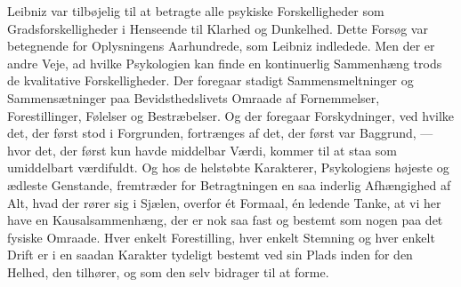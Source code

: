 \documentclass[12pt,a4paper]{book}
\newcommand{\opage}[1]{\marginnote{\footnotesize\textit{[#1]}}}
\begin{document}
Leibniz var tilbøjelig til at betragte alle psykiske Forskelligheder
som Gradsforskelligheder i Henseende til Klarhed og Dunkelhed. Dette
Forsøg var betegnende for Oplysningens Aarhundrede, som Leibniz
indledede. Men der er andre Veje, ad hvilke Psykologien kan finde en
kontinuerlig Sammenhæng trods de kvalitative Forskelligheder. Der
foregaar stadigt Sammensmeltninger og Sammensætninger paa
Bevidsthedslivets Omraade af Fornemmelser, Forestillinger, Følelser og
Bestræbelser. Og der foregaar Forskydninger, ved hvilke det, der
først stod i Forgrunden, fortrænges af det, der først var Baggrund,
--- hvor det, der først kun havde middelbar Værdi, kommer til at staa
som umiddelbart værdifuldt. Og hos de helstøbte Karakterer,
Psykologiens højeste og ædleste Genstande, fremtræder for
Betragtningen en saa inderlig Afhængighed af Alt, hvad der rører sig i
Sjælen, overfor ét Formaal, én ledende Tanke, at vi her have en
Kausalsammenhæng, der er nok saa fast og bestemt som nogen paa det
fysiske Omraade. Hver enkelt Forestilling, hver enkelt Stemning og
hver enkelt Drift er i en saadan Karakter tydeligt bestemt ved sin
Plads inden%
\opage{30}for den Helhed, den tilhører, og som den selv bidrager til
at forme.
\end{document}
